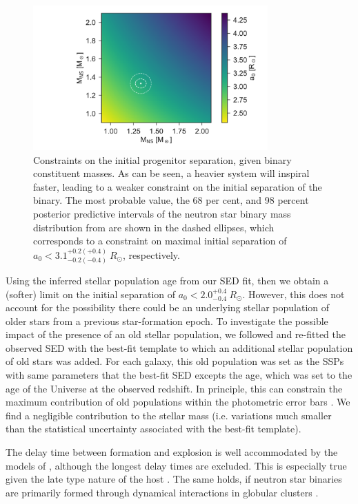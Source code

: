 \documentclass{aa}    %
\begin{document}
\begin{figure}
	\centering
	\includegraphics[width=9cm]{figures/prog_sep.pdf}
	\caption{Constraints on the initial progenitor separation, given binary constituent masses. As can be seen, a heavier system will inspiral faster, leading to a weaker constraint on the initial separation of the binary. The most probable value, the 68 per cent, and 98 percent posterior predictive intervals of the neutron star binary mass distribution from \citet{Kiziltan2013} are shown in the dashed ellipses, which corresponds to a constraint on maximal initial separation of $a_0 <3.1^{+0.2(+0.4)}_{-0.2(-0.4)}~R_\odot$, respectively.}
	\label{fig:prog_sep}
\end{figure}

Using the inferred stellar population age from our SED fit, then we obtain a
(softer) limit on the initial separation of $a_0 < 2.0^{+0.4}_{-0.4}~R_\odot$.
However, this does not account for the possibility there could be an underlying
stellar population of older stars from a previous star-formation epoch. To
investigate the possible impact of the presence of an old stellar population, we
followed \citet{Papovich2001} and re-fitted the observed SED with the best-fit
template to which an additional stellar population of old stars was added. For
each galaxy, this old population was set as the SSPs with same parameters that
the best-fit SED excepts the age, which was set to the age of the Universe at
the observed redshift. In principle, this can constrain the maximum contribution
of old populations within the photometric error bars \citep[see][for
details]{Papovich2001}. We find a negligible contribution to the stellar mass
(i.e. variations much smaller than the statistical uncertainty associated with
the best-fit template). 

The delay time between formation and explosion is well accommodated by the
models of \citet{Belczynski2006}, although the longest delay times are excluded.
This is especially true given the late type nature of the host
\citep{OShaughnessy2008}. The same holds, if neutron star binaries are primarily
formed through dynamical interactions in globular clusters \citep{Lee2010,
	Church2011}.
\end{document}
